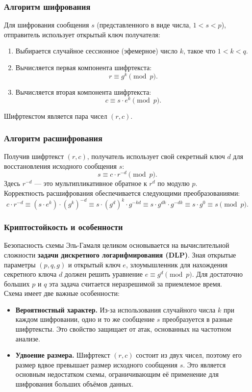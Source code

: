 \subsubsection{Алгоритм шифрования}
Для шифрования сообщения $s$ (представленного в виде числа, $1 < s < p$), отправитель использует открытый ключ получателя:
\begin{enumerate}
    \item Выбирается случайное сессионное (эфемерное) число $k$, такое что $1 < k < q$.
    \item Вычисляется первая компонента шифртекста:
    \[ r \equiv g^k \pmod p. \]
    \item Вычисляется вторая компонента шифртекста:
    \[ c \equiv s \cdot e^k \pmod p. \]
\end{enumerate}
Шифртекстом является пара чисел $(r, c)$.

\subsubsection{Алгоритм расшифрования}
Получив шифртекст $(r, c)$, получатель использует свой секретный ключ $d$ для восстановления исходного сообщения $s$:
\[ s \equiv c \cdot r^{-d} \pmod p. \]
Здесь $r^{-d}$ — это мультипликативное обратное к $r^d$ по модулю $p$.\\

\noindent Корректность расшифрования обеспечивается следующими преобразованиями:
\[ c \cdot r^{-d} \equiv (s \cdot e^k) \cdot (g^k)^{-d} \equiv s \cdot (g^d)^k \cdot g^{-kd} \equiv s \cdot g^{dk} \cdot g^{-dk} \equiv s \cdot g^{0} \equiv s \pmod p. \]

\subsubsection{Криптостойкость и особенности}
Безопасность схемы Эль-Гамаля целиком основывается на вычислительной сложности \textbf{задачи дискретного логарифмирования (DLP)}. Зная открытые параметры $(p, q, g)$ и открытый ключ $e$, злоумышленник для нахождения секретного ключа $d$ должен решить уравнение $e \equiv g^d \pmod p$. Для достаточно больших $p$ и $q$ эта задача считается неразрешимой за приемлемое время.\\

\noindent Схема имеет две важные особенности:
\begin{itemize}
    \item \textbf{Вероятностный характер.} Из-за использования случайного числа $k$ при каждом шифровании, одно и то же сообщение $s$ преобразуется в разные шифртексты. Это свойство защищает от атак, основанных на частотном анализе.
    \item \textbf{Удвоение размера.} Шифртекст $(r, c)$ состоит из двух чисел, поэтому его размер вдвое превышает размер исходного сообщения $s$. Это является основным недостатком схемы, ограничивающим её применение для шифрования больших объёмов данных.
\end{itemize}